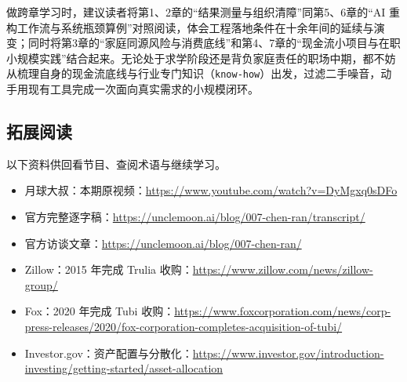 \documentclass[UTF8,a4paper,11pt,fontset=fandol]{ctexart}
\begin{document}
做跨章学习时，建议读者将第1、2章的“结果测量与组织清障”同第5、6章的“AI 重构工作流与系统瓶颈算例”对照阅读，体会工程落地条件在十余年间的延续与演变；同时将第3章的“家庭同源风险与消费底线”和第4、7章的“现金流小项目与在职小规模实践”结合起来。无论处于求学阶段还是背负家庭责任的职场中期，都不妨从梳理自身的现金流底线与行业专门知识（\texttt{know-how}）出发，过滤二手噪音，动手用现有工具完成一次面向真实需求的小规模闭环。
\subsection{拓展阅读}
以下资料供回看节目、查阅术语与继续学习。
\begin{itemize}
\item 月球大叔：本期原视频：\url{https://www.youtube.com/watch?v=DyMgxq0sDFo}
\item 官方完整逐字稿：\url{https://unclemoon.ai/blog/007-chen-ran/transcript/}
\item 官方访谈文章：\url{https://unclemoon.ai/blog/007-chen-ran/}
\item Zillow：2015 年完成 Trulia 收购：\url{https://www.zillow.com/news/zillow-group/}
\item Fox：2020 年完成 Tubi 收购：\url{https://www.foxcorporation.com/news/corp-press-releases/2020/fox-corporation-completes-acquisition-of-tubi/}
\item Investor.gov：资产配置与分散化：\url{https://www.investor.gov/introduction-investing/getting-started/asset-allocation}
\end{itemize}
\end{document}
